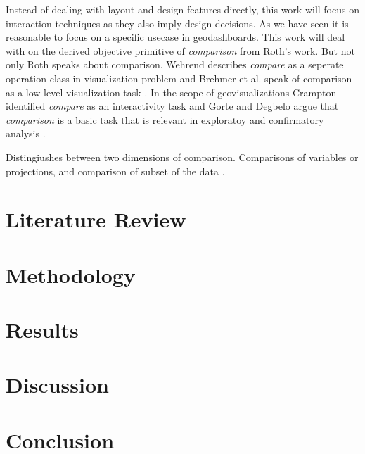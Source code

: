 \documentclass[12pt, twoside]{article}
\begin{document}
Instead of dealing with layout and design features directly, this work will focus on
interaction techniques as they also imply design decisions. As we have seen it is
reasonable to focus on a specific usecase in geodashboards. This work will deal with
on the derived objective primitive of \textit{comparison} from Roth's work. But not
only Roth speaks about comparison. Wehrend describes \textit{compare} as a seperate
operation class in visualization problem \citep{Wehrend.1990} and Brehmer et al.
speak of comparison as a low level visualization task \citep*{Brehmer.2013}. In the
scope of geovisualizations Crampton identified \textit{compare} as an interactivity task
\citep{Crampton.2002} and Gorte and Degbelo argue that \textit{comparison} is a basic
task that is relevant in exploratoy and confirmatory analysis \citep{Gorte.2022}.

Distingiushes between two dimensions of comparison. Comparisons of
variables or projections, and comparison of subset of the data \citep*{Buja.1996}.


\section{Literature Review}

\section{Methodology}

\section{Results}

\section{Discussion}

\section{Conclusion}



\end{document}
